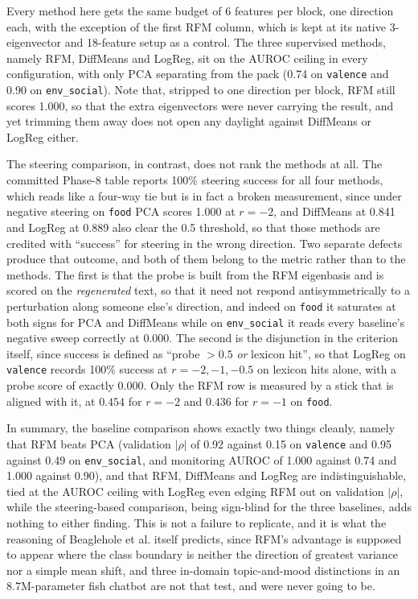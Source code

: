 Every method here gets the same budget of 6 features per block, one direction each, with
the exception of the first RFM column, which is kept at its native 3-eigenvector and
18-feature setup as a control. The three supervised methods, namely RFM, DiffMeans and
LogReg, sit on the AUROC ceiling in every configuration, with only PCA separating from the
pack (0.74 on \verb|valence| and 0.90 on \verb|env_social|). Note that, stripped to one
direction per block, RFM still scores 1.000, so that the extra eigenvectors were never
carrying the result, and yet trimming them away does not open any daylight against
DiffMeans or LogReg either.

The steering comparison, in contrast, does not rank the methods at all. The committed
Phase-8 table reports 100\% steering success for all four methods, which reads like a
four-way tie but is in fact a broken measurement, since under negative steering on
\verb|food| PCA scores 1.000 at $r = -2$, and DiffMeans at 0.841 and LogReg at 0.889 also
clear the 0.5 threshold, so that those methods are credited with ``success'' for steering
in the wrong direction. Two separate defects produce that outcome, and both of them belong
to the metric rather than to the methods. The first is that the probe is built from the
RFM eigenbasis and is scored on the \emph{regenerated} text, so that it need not respond
antisymmetrically to a perturbation along someone else's direction, and indeed on
\verb|food| it saturates at both signs for PCA and DiffMeans while on \verb|env_social| it
reads every baseline's negative sweep correctly at $0.000$. The second is the disjunction
in the criterion itself, since success is defined as ``probe $>0.5$ \emph{or} lexicon
hit'', so that LogReg on \verb|valence| records 100\% success at $r = -2, -1, -0.5$ on
lexicon hits alone, with a probe score of exactly $0.000$. Only the RFM row is measured by
a stick that is aligned with it, at $0.454$ for $r = -2$ and $0.436$ for $r = -1$ on
\verb|food|.

In summary, the baseline comparison shows exactly two things cleanly, namely that RFM
beats PCA (validation $|\rho|$ of 0.92 against 0.15 on \verb|valence| and 0.95 against
0.49 on \verb|env_social|, and monitoring AUROC of 1.000 against 0.74 and 1.000 against
0.90), and that RFM, DiffMeans and LogReg are indistinguishable, tied at the AUROC ceiling
with LogReg even edging RFM out on validation $|\rho|$, while the steering-based
comparison, being sign-blind for the three baselines, adds nothing to either finding. This
is not a failure to replicate, and it is what the reasoning of Beaglehole et al. itself
predicts, since RFM's advantage is supposed to appear where the class boundary is neither
the direction of greatest variance nor a simple mean shift, and three in-domain
topic-and-mood distinctions in an 8.7M-parameter fish chatbot are not that test, and were
never going to be.

